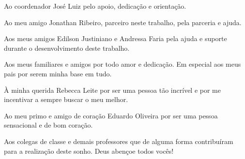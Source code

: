 \begin{agradecimentos}
\par Ao coordenador José Luiz pelo apoio, dedicação e orientação.

\par Ao meu amigo Jonathan Ribeiro, parceiro neste trabalho, pela parceria e ajuda.

\par Aos meus amigos Edilson Justiniano e Andressa Faria pela ajuda e suporte durante o desenvolvimento deste trabalho.

\par Aos meus familiares e amigos por todo amor e dedicação. Em especial aos meus pais por serem minha base em tudo.

\par À minha querida Rebecca Leite por ser uma pessoa tão incrível e por me incentivar a sempre buscar o meu melhor.

\par Ao meu primo e amigo de coração Eduardo Oliveira por ser uma pessoa sensacional e de bom coração.

\par Aos colegas de classe e demais professores que de alguma forma contribuíram para a realização deste sonho. Deus
abençoe todos vocês!

\end{agradecimentos}




